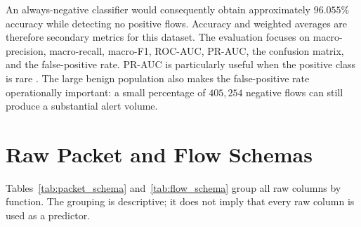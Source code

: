 \documentclass[11pt,fleqn]{report}
\begin{document}
An always-negative classifier would consequently obtain approximately $96.055\%$ accuracy while detecting no positive flows. Accuracy and weighted averages are therefore secondary metrics for this dataset. The evaluation focuses on macro-precision, macro-recall, macro-F1, ROC-AUC, PR-AUC, the confusion matrix, and the false-positive rate. PR-AUC is particularly useful when the positive class is rare \cite{SaitoRehmsmeier2015}. The large benign population also makes the false-positive rate operationally important: a small percentage of $405{,}254$ negative flows can still produce a substantial alert volume.

\section{Raw Packet and Flow Schemas}
\label{subsec:raw_schemas}

Tables~\ref{tab:packet_schema} and~\ref{tab:flow_schema} group all raw columns by function. The grouping is descriptive; it does not imply that every raw column is used as a predictor.
\end{document}
